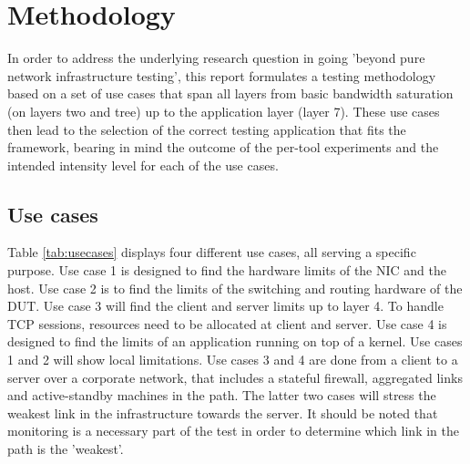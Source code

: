 \chapter{Methodology}\label{ch:method}
In order to address the underlying research question in going 'beyond pure network infrastructure testing', this report formulates a testing methodology based on a set of use cases that span all layers from basic bandwidth saturation (on layers two and tree) up to the application layer (layer 7).
These use cases then lead to the selection of the correct testing application that fits the framework, bearing in mind the outcome of the per-tool experiments and the intended intensity level for each of the use cases.

\section{Use cases}\label{sec:usecase}

Table \ref{tab:usecases} displays four different use cases, all serving a specific purpose.
Use case 1 is designed to find the hardware limits of the NIC and the host. Use case 2 is to find the limits of the  switching and routing hardware of the DUT.
Use case 3 will find the client and server limits up to layer 4. To handle TCP sessions, resources need to be allocated at client and server. 
Use case 4 is designed to find the limits of an application running on top of a kernel.  
Use cases 1 and 2 will show local limitations. 
Use cases 3 and 4 are done from a client to a server over a corporate network, that includes a stateful firewall, aggregated links and active-standby machines in the path. The latter two cases will stress the weakest link in the infrastructure towards the server.  
It should be noted that monitoring is a necessary part of the test in order to determine which link in the path is the 'weakest'.

